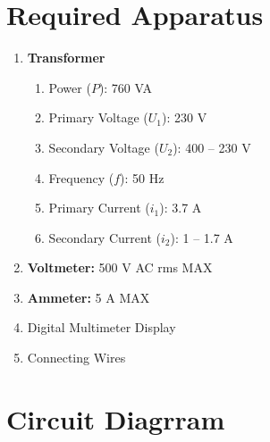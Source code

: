 \documentclass[a4paper,12pt]{article}
\begin{document}
	\section{Required Apparatus}
	\begin{enumerate}
		\item \textbf{Transformer}
		\begin{enumerate}
			\item Power (\(P\)): 760 VA
			\item Primary Voltage (\(U_1\)): 230 V
			\item Secondary Voltage (\(U_2\)): 400 -- 230 V
			\item Frequency (\(f\)): 50 Hz
			\item Primary Current (\(i_1\)): 3.7 A
			\item Secondary Current (\(i_2\)): 1 -- 1.7 A
		\end{enumerate}
		\item \textbf{Voltmeter:} 500 V AC rms MAX
		\item \textbf{Ammeter:} 5 A MAX
		\item Digital Multimeter Display
		\item Connecting Wires
	\end{enumerate}
	

	\section{Circuit Diagrram}
\end{document}
